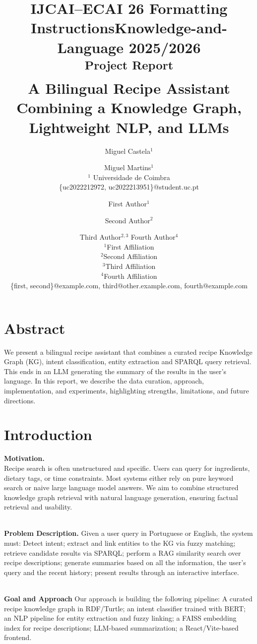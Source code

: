 \documentclass{article}
\title{IJCAI--ECAI 26 Formatting Instructions}
\author{
Miguel Castela$^1$ \and Miguel Martins$^1$\\
\affiliations
$^1$ Universidade de Coimbra\\
\emails
\{uc2022212972, uc2022213951\}@student.uc.pt
}
\author{
First Author$^1$
\and
Second Author$^2$\and
Third Author$^{2,3}$\And
Fourth Author$^4$\\
\affiliations
$^1$First Affiliation\\
$^2$Second Affiliation\\
$^3$Third Affiliation\\
$^4$Fourth Affiliation\\
\emails
\{first, second\}@example.com,
third@other.example.com,
fourth@example.com
}
\begin{document}
\title{Knowledge-and-Language 2025/2026 \\
{\textsuperscript{Project Report}}\\
A Bilingual Recipe Assistant Combining a Knowledge Graph, Lightweight NLP, and LLMs
}
\maketitle

\section{Abstract}
\noindent
We present a bilingual recipe assistant that combines a curated recipe Knowledge Graph (KG), intent classification, entity extraction and SPARQL query retrieval.
This ends in an LLM generating the summary of the results in the user's language. In this report, we describe the data curation, approach, implementation, and experiments, highlighting strengths, limitations, and future directions.

\section{Introduction}

\noindent
\textbf{Motivation.}
\\
Recipe search is often unstructured and specific. Users can query for ingredients, dietary tags, or time constraints. Most systems either rely on pure keyword search or naive large language model answers. We aim to combine structured knowledge graph retrieval with natural language generation, ensuring factual retrieval and  usability.

\noindent
\\
\textbf{Problem Description.}
Given a user query in Portuguese or English, the system must:
Detect intent; extract and link entities to the KG via fuzzy matching; retrieve candidate results via SPARQL; perform a RAG similarity search over recipe descriptions; generate summaries based on all the information, the user's query and the recent history; present results through an interactive interface.




\noindent
\\
\textbf{Goal and Approach}
Our approach is building the following pipeline:
A curated recipe knowledge graph in RDF/Turtle; an intent classifier trained with BERT; an NLP pipeline for entity extraction and fuzzy linking; a FAISS embedding index for recipe descriptions; LLM-based summarization; a React/Vite-based frontend.
\end{document}

